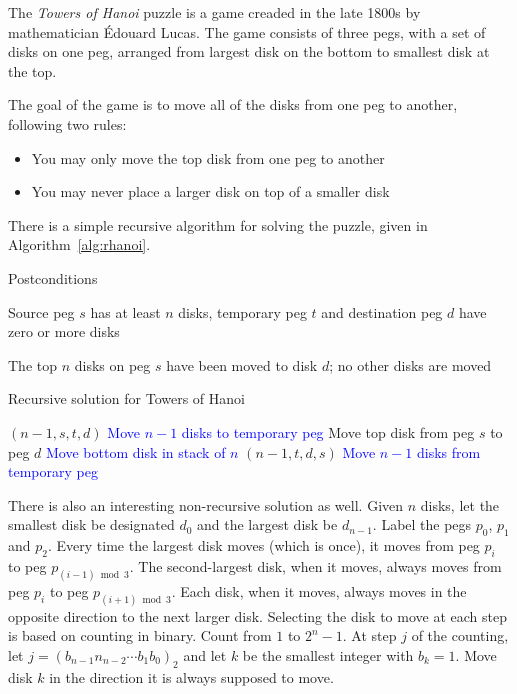 \item{}
The \emph{Towers of Hanoi} puzzle is a game creaded in the late 1800s by
mathematician \'{E}douard Lucas. The game consists of three pegs, with a set
of disks on one peg, arranged from largest disk on the bottom to smallest disk
at the top.\parend

The goal of the game is to move all of the disks from one peg to another,
following two rules:
\begin{itemize}
  \item You may only move the top disk from one peg to another
  \item You may never place a larger disk on top of a smaller disk
\end{itemize}

There is a simple recursive algorithm for solving the puzzle, given in
Algorithm~\ref{alg:rhanoi}.

\begin{algorithm}[H]
  \vskip6pt
  \begin{labeling}{Postconditions}
    \item [\bf Preconditions] Source peg $s$ has at least $n$ disks, temporary
    peg $t$ and destination peg $d$ have zero or more disks
    \item [\bf Postconditions] The top $n$ disks on peg $s$ have been moved to
    disk $d$; no other disks are moved
  \end{labeling}

  \caption{Recursive solution for Towers of Hanoi}\label{alg:rhanoi}
  \begin{algorithmic}[1]
        $(n-1,s,t,d)$
        \Comment\textcolor{blue}{Move $n-1$ disks to temporary peg}
        \State Move top disk from peg $s$ to peg $d$
        \Comment\textcolor{blue}{Move bottom disk in stack of $n$}
        $(n-1,t,d,s)$
        \Comment\textcolor{blue}{Move $n-1$ disks from temporary peg}
      \EndIf
    \EndProcedure
  \end{algorithmic}
\end{algorithm}
There is also an interesting non-recursive solution as well. Given $n$ disks,
let the smallest disk be designated $d_0$ and the largest disk be $d_{n-1}$.
Label the pegs $p_0$, $p_1$ and $p_2$. Every time the largest disk moves (which
is once), it moves from peg $p_i$ to peg $p_{(i-1)\bmod 3}$. The second-largest
disk, when it moves, always moves from peg $p_i$ to peg $p_{(i+1)\bmod 3}$.
Each disk, when it moves, always moves in the opposite direction to the next
larger disk.\parend
Selecting the disk to move at each step is based on counting in binary. Count
from $1$ to $2^n-1$. At step $j$ of the counting, let $j=(b_{n-1}n_{n-2}\cdots
b_1b_0)_2$ and let $k$ be the smallest integer with $b_k=1$. Move disk $k$ in
the direction it is always supposed to move.\parend

